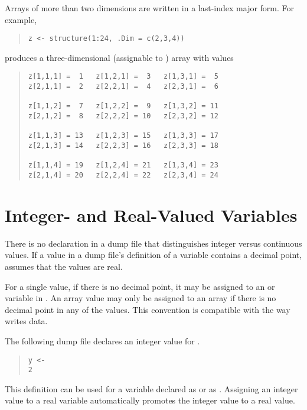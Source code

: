 Arrays of more than two dimensions are written in a last-index major form.
For example, 
%
\begin{quote}
\begin{verbatim}
z <- structure(1:24, .Dim = c(2,3,4))
\end{verbatim}
\end{quote}
%
produces a three-dimensional  (assignable to )
array  with values
%
\begin{quote}
\begin{verbatim}
z[1,1,1] =  1   z[1,2,1] =  3   z[1,3,1] =  5
z[2,1,1] =  2   z[2,2,1] =  4   z[2,3,1] =  6

z[1,1,2] =  7   z[1,2,2] =  9   z[1,3,2] = 11
z[2,1,2] =  8   z[2,2,2] = 10   z[2,3,2] = 12

z[1,1,3] = 13   z[1,2,3] = 15   z[1,3,3] = 17
z[2,1,3] = 14   z[2,2,3] = 16   z[2,3,3] = 18

z[1,1,4] = 19   z[1,2,4] = 21   z[1,3,4] = 23
z[2,1,4] = 20   z[2,2,4] = 22   z[2,3,4] = 24
\end{verbatim}
\end{quote}



\section{Integer- and Real-Valued Variables}

There is no declaration in a dump file that distinguishes integer
versus continuous values.  If a value in a dump file's definition of a
variable contains a decimal point, \Stan assumes that the values are
real.  

For a single value, if there is no decimal point, it may be assigned
to an  or  variable in \Stan.  An array value may
only be assigned to an  array if there is no decimal point
in any of the values.  This convention is compatible with the way \R
writes data.

The following dump file declares an integer value for .
%
\begin{quote}
\begin{Verbatim} 
y <- 
2
\end{Verbatim}
\end{quote}
% 
This definition can be used for a \Stan variable  declared as
 or as .  Assigning an integer value to a real
variable automatically promotes the integer value to a real value.

